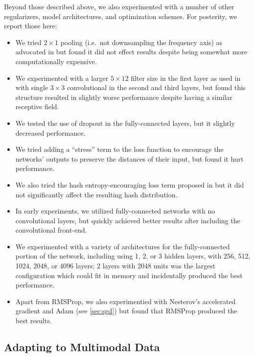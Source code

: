 Beyond those described above, we also experimented with a number of other regularizers, model architectures, and optimization schemes.
For posterity, we report those here:
\begin{itemize}
\item We tried $2 \times 1$ pooling (i.e.\ not downsampling the frequency axis) as advocated in \cite{humphrey2012rethinking} but found it did not effect results despite being somewhat more computationally expensive.
\item We experimented with a larger $5 \times 12$ filter size in the first layer as used in \cite{raffel2015large} with single $3 \times 3$ convolutional in the second and third layers, but found this structure resulted in slightly worse performance despite having a similar receptive field.
\item We tested the use of dropout \cite{hinton2012improving} in the fully-connected layers, but it slightly decreased performance.
\item We tried adding a ``stress'' \cite{kruskal1964multidimensional} term to the loss function to encourage the networks' outputs to preserve the distances of their input, but found it hurt performance.
\item We also tried the hash entropy-encouraging loss term proposed in \cite[equation (3)]{yang2015supervised} but it did not significantly affect the resulting hash distribution.
\item In early experiments, we utilized fully-connected networks with no convolutional layers, but quickly achieved better results after including the convolutional front-end.
\item We experimented with a variety of architectures for the fully-connected portion of the network, including using 1, 2, or 3 hidden layers, with 256, 512, 1024, 2048, or 4096 layers; 2 layers with 2048 units was the largest configuration which could fit in memory and incidentally produced the best performance.
\item Apart from RMSProp, we also experimentied with Nesterov's accelerated gradient \cite{nesterov1983method} and Adam \cite{kingma2015adam} (see \cref{sec:sgd}) but found that RMSProp produced the best results.
\end{itemize}

\subsection{Adapting to Multimodal Data}
\label{sec:multimodal}

